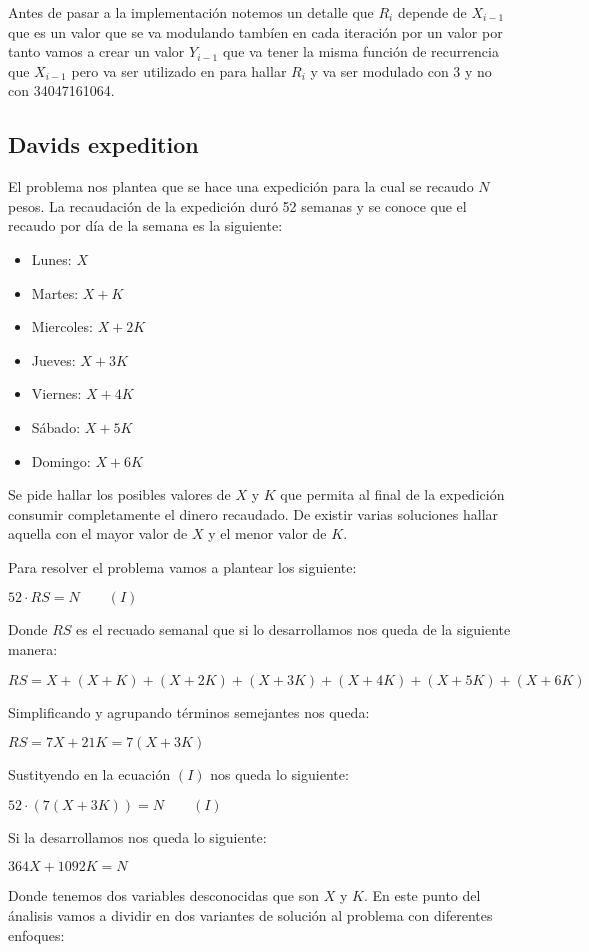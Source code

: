Antes de pasar a la implementación notemos un detalle que $R_{i}$ depende de $X_{i-1}$ que es un valor que se va modulando tambíen en cada iteración por un valor por tanto vamos a crear un valor  $Y_{i-1}$ que va tener la misma función de recurrencia que $X_{i-1}$ pero va ser utilizado en para hallar $R_{i}$ y va ser modulado con 3 y no con 34047161064.

\subsection{Davids expedition} El problema nos plantea que se hace una expedición para la cual se recaudo $N$ pesos. La recaudación de la expedición duró 52 semanas y se conoce que el recaudo por día de la semana es la siguiente:

\begin{itemize}
	\item Lunes: $X$
	\item Martes: $X + K$
	\item Miercoles: $X + 2K$
	\item Jueves: $X + 3K$
	\item Viernes: $X + 4K$
	\item Sábado: $X + 5K$
	\item Domingo: $X + 6K$
\end{itemize}

Se pide hallar los posibles valores de $X$ y $K$ que permita al final de la expedición consumir completamente el dinero recaudado. De existir varias soluciones hallar aquella con el mayor valor de $X$ y el menor valor de $K$. 

Para resolver el problema vamos a plantear los siguiente:

$52 \cdot RS = N \qquad (I)$

Donde $RS$ es el recuado semanal que si lo desarrollamos nos queda de la siguiente manera:

$RS = X + (X+K) + (X+2K) + (X+3K) + (X+4K) + (X+5K) +  (X+6K)$

Simplificando y agrupando términos semejantes nos queda:

$RS=7X+21K = 7(X+3K)$

Sustityendo en la ecuación $(I)$ nos queda lo siguiente:


$52 \cdot (7(X+3K)) = N \qquad (I)$

Si la desarrollamos nos queda lo siguiente:

$364X + 1092K = N$ 

Donde tenemos dos variables desconocidas que son $X$ y $K$. En este punto del ánalisis vamos a dividir en dos variantes de solución al problema con diferentes enfoques:

